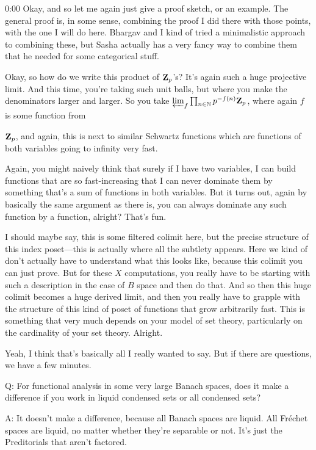 \begin{unfinished}{0:00}
Okay, and so let me again just give a proof sketch, or an example. The general proof is, in some sense, combining the proof I did there with those points, with the one I will do here. Bhargav and I kind of tried a minimalistic approach to combining these, but Sasha actually has a very fancy way to combine them that he needed for some categorical stuff.

Okay, so how do we write this product of $\mathbf Z_p$'s? It's again such a huge projective limit. And this time, you're taking such unit balls, but where you make the denominators larger and larger. So you take $\varprojlim_f \prod_{n \in \mathbb{N}} p^{-f(n)} \mathbf Z_p$, where again $f$ is some function from 

$\mathbf Z_p$, and again, this is next to similar Schwartz functions which are functions of both variables going to infinity very fast.

Again, you might naively think that surely if I have two variables, I can build functions that are so fast-increasing that I can never dominate them by something that's a sum of functions in both variables. But it turns out, again by basically the same argument as there is, you can always dominate any such function by a function, alright? That's fun.

I should maybe say, this is some filtered colimit here, but the precise structure of this index poset---this is actually where all the subtlety appears. Here we kind of don't actually have to understand what this looks like, because this colimit you can just prove. But for these $X$ computations, you really have to be starting with such a description in the case of $B$ space and then do that. And so then this huge colimit becomes a huge derived limit, and then you really have to grapple with the structure of this kind of poset of functions that grow arbitrarily fast. This is something that very much depends on your model of set theory, particularly on the cardinality of your set theory. Alright.

Yeah, I think that's basically all I really wanted to say. But if there are questions, we have a few minutes.

Q: For functional analysis in some very large Banach spaces, does it make a difference if you work in liquid condensed sets or all condensed sets?

A: It doesn't make a difference, because all Banach spaces are liquid. All Fréchet spaces are liquid, no matter whether they're separable or not. It's just the Preditorials that aren't factored.


\end{unfinished}
